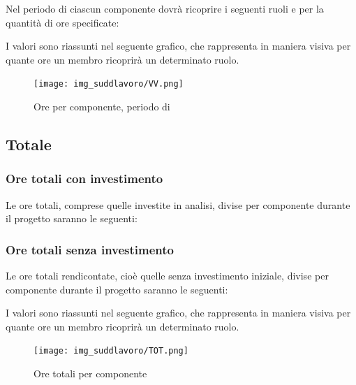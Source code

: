 \subsubsection{\VV}
Nel periodo di \VV{} ciascun componente dovrà ricoprire i seguenti ruoli e per la quantità di ore specificate:

I valori sono riassunti nel seguente grafico, che rappresenta in maniera visiva per quante ore un membro ricoprirà un determinato ruolo.
\begin{figure}[H]
	\centering
	\texttt{[image: img\_suddlavoro/VV.png]}
	\caption{Ore per componente, periodo di \VV{}}
\end{figure}

\subsection{Totale}
\subsubsection{Ore totali con investimento}
Le ore totali, comprese quelle investite in analisi, divise per componente durante il progetto saranno le seguenti:



\subsubsection{Ore totali senza investimento}
Le ore totali rendicontate, cioè quelle senza investimento iniziale, divise per componente durante il progetto saranno le seguenti:


I valori sono riassunti nel seguente grafico, che rappresenta in maniera visiva per quante ore un membro ricoprirà un determinato ruolo.
\begin{figure}[H]
	\centering
	\texttt{[image: img\_suddlavoro/TOT.png]}
	\caption{Ore totali per componente}
\end{figure}





